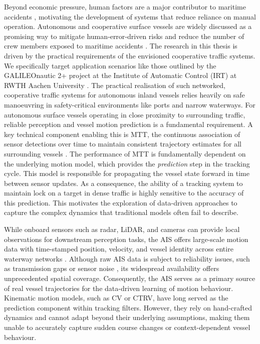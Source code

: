 Beyond economic pressure, human factors are a major contributor to maritime accidents \parencite{BSU2024, DEVOS2021107558}, motivating the development of systems that reduce reliance on manual operation. Autonomous and cooperative surface vessels %
are widely discussed as a promising way to mitigate human‑error‑driven risks and reduce the number of crew members exposed to maritime accidents \parencite{DEVOS2021107558}. %
The research in this thesis is driven by the practical requirements of the envisioned cooperative traffic systems. We specifically target application scenarios like those outlined by the GALILEOnautic 2+ project at the Institute of Automatic Control (IRT) at RWTH Aachen University \parencite{TimEis2025}.
The practical realisation of such networked, cooperative traffic systems for autonomous inland vessels relies heavily on safe manoeuvring in safety-critical environments like ports and narrow waterways.
For autonomous surface vessels operating in close proximity to surrounding traffic, reliable perception and vessel motion prediction is a fundamental requirement. A key technical component enabling this is \ac{MTT}, the continuous association of sensor detections over time to maintain consistent trajectory estimates for all surrounding vessels \parencite{TimEis2025}.
The performance of \ac{MTT} is fundamentally dependent on the underlying motion model, which provides the %
\emph{prediction} %
step in the tracking cycle.
This model is responsible for propagating the vessel state forward in time between sensor updates.
As a consequence, the ability of a tracking system to maintain lock on a target in dense traffic is highly sensitive to the accuracy of this prediction. This motivates the exploration of data-driven approaches to capture the complex dynamics that traditional models often fail to describe.

While onboard sensors such as radar, LiDAR, and cameras can provide local observations for downstream perception tasks, the \ac{AIS} offers large-scale motion data with time-stamped position, velocity, and vessel identity across entire waterway networks \parencite{noaa2025aisdict}. %
Although raw \ac{AIS} data is subject to reliability issues, such as transmission gaps or sensor noise \parencite{Zhao_Shi_Yang_2018}, its widespread availability offers unprecedented spatial coverage.
Consequently, the \ac{AIS} serves as a primary source of real vessel trajectories for the data-driven learning of motion behaviour.
Kinematic motion models, such as \ac{CV} or \ac{CTRV}, have long served as the prediction component within tracking filters.
However, they rely on hand-crafted dynamics and cannot adapt beyond their underlying assumptions, making them unable to accurately capture sudden course changes or context-dependent vessel behaviour.

